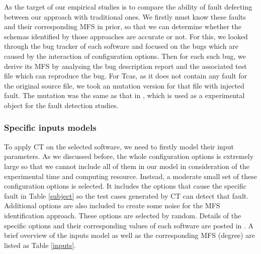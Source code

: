 \documentclass{sig-alternate}
\begin{document}
As the target of our empirical studies is to compare the ability of fault defecting between our approach with traditional ones. We firstly must know these faults and their corresponding MFS in prior, so that we can determine whether the schemas identified by those approaches are accurate or not.  For this, we looked through the bug tracker of each software and focused on the bugs which are caused by the interaction of configuration options. Then for each such bug, we derive its MFS by analysing the bug description report and the associated test file which can reproduce the bug. For Tcas, as it does not contain any fault for the original source file, we took an mutation version for that file with injected fault. The mutation was the same as that in \cite{kuhn2006pseudo}, which is used as a experimental object for the fault detection studies.



\subsubsection{Specific inputs models}
To apply CT on the selected software, we need to firstly model their input parameters. As we discussed before, the whole configuration options is extremely large so that we cannot include all of them in our model in consideration of the experimental time and computing resource. Instead, a moderate small set of these configuration options is selected.  It includes the options that cause the specific fault in Table \ref{subject} so the test cases generated by CT can detect that fault. Additional options are also included to create some noise for the MFS identification approach. These options are selected by random. Details of the specific options and their corresponding values of each software are posted in .  A brief overview of the inputs model as well as the corresponding MFS (degree) are listed as Table \ref{inputs}.

\end{document}
